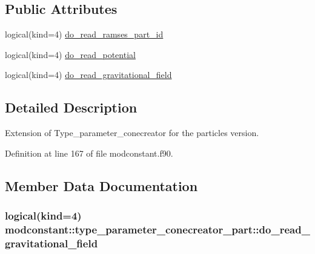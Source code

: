 \subsection*{Public Attributes}
\begin{DoxyCompactItemize}
\item 
logical(kind=4) \hyperlink{structmodconstant_1_1type__parameter__conecreator__part_a767cd774e985d3ce50b3131eb7ffa50b}{do\-\_\-read\-\_\-ramses\-\_\-part\-\_\-id}
\item 
logical(kind=4) \hyperlink{structmodconstant_1_1type__parameter__conecreator__part_ad8db85990febd9c00c5a5a6a2f1d0fd7}{do\-\_\-read\-\_\-potential}
\item 
logical(kind=4) \hyperlink{structmodconstant_1_1type__parameter__conecreator__part_ac4a1cdc3acedd360fdb769ce7975ba6c}{do\-\_\-read\-\_\-gravitational\-\_\-field}
\end{DoxyCompactItemize}


\subsection{Detailed Description}
Extension of Type\-\_\-parameter\-\_\-conecreator for the particles version. 

Definition at line 167 of file modconstant.\-f90.



\subsection{Member Data Documentation}
\hypertarget{structmodconstant_1_1type__parameter__conecreator__part_ac4a1cdc3acedd360fdb769ce7975ba6c}{
\subsubsection[{do\-\_\-read\-\_\-gravitational\-\_\-field}]{\setlength{\rightskip}{0pt plus 5cm}logical(kind=4) modconstant\-::type\-\_\-parameter\-\_\-conecreator\-\_\-part\-::do\-\_\-read\-\_\-gravitational\-\_\-field}}\label{structmodconstant_1_1type__parameter__conecreator__part_ac4a1cdc3acedd360fdb769ce7975ba6c}


